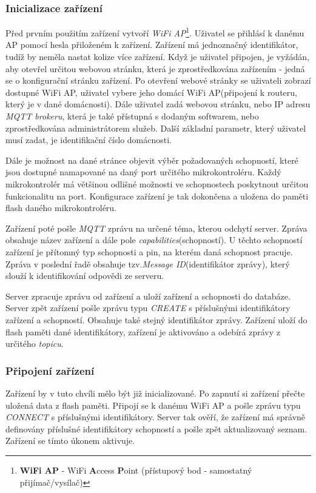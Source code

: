 \subsubsection*{Inicializace zařízení}
Před prvním použitím zařízení vytvoří \emph{WiFi AP}\footnote{\textbf{WiFi AP} - WiFi \textbf{A}ccess \textbf{P}oint (přístupový bod - samostatný přijímač/vysílač)}.
Uživatel se přihlásí k danému AP pomocí hesla přiloženém k zařízení. Zařízení má jednoznačný identifikátor, tudíž by neměla nastat kolize více zařízení.
Když je uživatel připojen, je vyžádán, aby otevřel určitou webovou stránku, která je zprostředkována zařízením - jedná se o konfigurační stránku zařízení.
Po otevření webové stránky se uživateli zobrazí dostupné WiFi AP, uživatel vybere jeho domácí WiFi AP(připojení k routeru, který je v dané domácnosti).
Dále uživatel zadá webovou stránku, nebo IP adresu \emph{MQTT brokeru}, která je také přístupná s dodaným softwarem, nebo zprostředkována administrátorem služeb.
Další základní parametr, který uživatel musí zadat, je identifikační číslo domácnosti.

Dále je možnost na dané stránce objevit výběr požadovaných schopností, které jsou dostupné namapované na daný port určitého mikrokontroléru.
Každý mikrokontrolér má většinou odlišné možnosti ve schopnostech poskytnout určitou funkcionalitu na port.
Konfigurace zařízení je tak dokončena a uložena do paměti flash daného mikrokontroléru.

Zařízení poté pošle \emph{MQTT} zprávu na určené téma, kterou odchytí server. Zpráva obsahuje název zařízení a dále pole \emph{capabilities}(schopností).
U těchto schopností zařízení je přítomný typ schopnosti a pin, na kterém daná schopnost pracuje.
Zpráva v poslední řadě obsahuje tzv.\emph{Message ID}(identifikátor zprávy), který slouží k identifikování odpovědi ze serveru.

Server zpracuje zprávu od zařízení a uloží zařízení a schopnosti do databáze.
Server zpět zařízení pošle zprávu typu \emph{CREATE} s příslušnými identifikátory zařízení a schopností. Obsahuje také stejný identifikátor zprávy.
Zařízení uloží do flash paměti dané identifikátory, zařízení je aktivováno a odebírá zprávy z určitého \emph{topicu}.

\subsubsection*{Připojení zařízení}
Zařízení by v tuto chvíli mělo být již inicializované. Po zapnutí si zařízení přečte uložená data z flash paměti.
Připojí se k danému WiFi AP a pošle zprávu typu \emph{CONNECT} s příslušnými identifikátory. Server tak ověří, že zařízení má správně definovány příslušné identifikátory schopností a pošle zpět aktualizovaný seznam.
Zařízení se tímto úkonem aktivuje.

